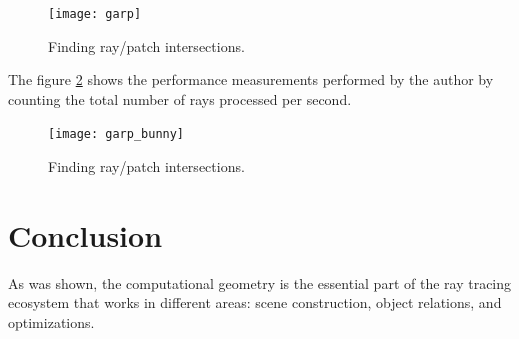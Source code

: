 \documentclass[12pt,a4paper,english]{article}
\begin{document}
\begin{figure}[H]
    \centering
    \texttt{[image: garp]}
    \caption[]{Finding ray/patch intersections.}
    \label{fig:garp}
\end{figure}

The figure \ref{fig:garp_bunny} shows the performance measurements performed by the author by counting the total number of rays processed per second.

\begin{figure}[H]
    \centering
    \texttt{[image: garp\_bunny]}
    \caption[]{Finding ray/patch intersections.}
    \label{fig:garp_bunny}
\end{figure}

\section{Conclusion}

As was shown, the computational geometry is the essential part of the ray tracing ecosystem that works in different areas: scene construction, object relations, and optimizations.

\nocite{*}


\end{document}
